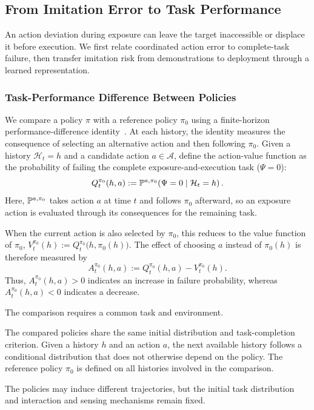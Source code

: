 \subsection{From Imitation Error to Task Performance}
\label{sec:actionanalysis}
An action deviation during exposure can leave the target inaccessible or displace it before execution.
We first relate coordinated action error to complete-task failure, then transfer imitation risk from demonstrations to deployment through a learned representation.

\subsubsection{Task-Performance Difference Between Policies}
\label{sec:actionconsequences}
We compare a policy $\pi$ with a reference policy $\pi_0$ using a finite-horizon performance-difference identity~\cite{ross2014aggrevate,cheng2018value}.
At each history, the identity measures the consequence of selecting an alternative action and then following $\pi_0$.
Given a history $\mathcal H_t=h$ and a candidate action
$a\in\mathcal A$, define the action-value function as the
probability of failing the complete exposure-and-execution task ($\Psi=0$):
\begin{equation}
 Q_t^{\pi_0}(h,a)
 :=\mathbb P^{a,\pi_0}\!\left(\Psi=0\mid\mathcal H_t=h\right).
 \label{eq:historyactionvalue}
\end{equation}
Here, $\mathbb P^{a,\pi_0}$ takes action $a$ at time $t$ and follows $\pi_0$ afterward, so an exposure action is evaluated through its consequences for the remaining task.

When the current action is also selected by $\pi_0$, this reduces
to the value function of $\pi_0$, $V_t^{\pi_0}(h) :=Q_t^{\pi_0}\bigl(h,\pi_0(h)\bigr).$
The effect of choosing $a$ instead of $\pi_0(h)$ is therefore
measured by
\begin{equation}
 A_t^{\pi_0}(h,a)
 :=Q_t^{\pi_0}(h,a)-V_t^{\pi_0}(h).
 \label{eq:actionconsequence}
\end{equation}
Thus, $A_t^{\pi_0}(h,a)>0$ indicates an increase in failure probability, whereas $A_t^{\pi_0}(h,a)<0$ indicates a decrease.

The comparison requires a common task and environment.
\begin{assumption}
\label{ass:commonprocess}
The compared policies share the same initial distribution and
task-completion criterion. Given a history $h$ and an action $a$,
the next available history follows a conditional distribution
that does not otherwise depend on the policy.
The reference policy $\pi_0$ is defined on all histories
involved in the comparison.
\end{assumption} 
The policies may induce different trajectories, but the initial task distribution and interaction and sensing mechanisms remain fixed.

